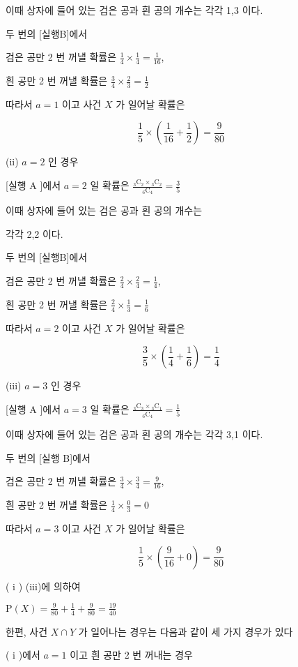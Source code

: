 \documentclass[10pt]{article}
\begin{document}
이때 상자에 들어 있는 검은 공과 흰 공의 개수는 각각 1,3 이다.

두 번의 [실행B]에서

검은 공만 2 번 꺼낼 확률은 \(\frac{1}{4} \times \frac{1}{4}=\frac{1}{16}\),

흰 공만 2 번 꺼낼 확률은 \(\frac{3}{4} \times \frac{2}{3}=\frac{1}{2}\)

따라서 \(a=1\) 이고 사건 \(X\) 가 일어날 확률은

\[
\frac{1}{5} \times\left(\frac{1}{16}+\frac{1}{2}\right)=\frac{9}{80}
\]

(ii) \(a=2\) 인 경우

[실행 A ]에서 \(a=2\) 일 확률은 \(\frac{{ }_{3} \mathrm{C}_{2} \times{ }_{3} \mathrm{C}_{2}}{{ }_{6} \mathrm{C}_{4}}=\frac{3}{5}\)

이때 상자에 들어 있는 검은 공과 흰 공의 개수는

각각 2,2 이다.

두 번의 [실행B]에서

검은 공만 2 번 꺼낼 확률은 \(\frac{2}{4} \times \frac{2}{4}=\frac{1}{4}\),

흰 공만 2 번 꺼낼 확률은 \(\frac{2}{4} \times \frac{1}{3}=\frac{1}{6}\)

따라서 \(a=2\) 이고 사건 \(X\) 가 일어날 확률은

\[
\frac{3}{5} \times\left(\frac{1}{4}+\frac{1}{6}\right)=\frac{1}{4}
\]

(iii) \(a=3\) 인 경우

[실행 A ]에서 \(a=3\) 일 확률은 \(\frac{{ }_{3} \mathrm{C}_{3} \times{ }_{3} \mathrm{C}_{1}}{{ }_{6} \mathrm{C}_{4}}=\frac{1}{5}\)

이때 상자에 들어 있는 검은 공과 흰 공의 개수는 각각 3,1 이다.

두 번의 [실행 B]에서

검은 공만 2 번 꺼낼 확률은 \(\frac{3}{4} \times \frac{3}{4}=\frac{9}{16}\),

흰 공만 2 번 꺼낼 확률은 \(\frac{1}{4} \times \frac{0}{3}=0\)

따라서 \(a=3\) 이고 사건 \(X\) 가 일어날 확률은

\[
\frac{1}{5} \times\left(\frac{9}{16}+0\right)=\frac{9}{80}
\]

( i ) (iii)에 의하여

\(\mathrm{P}(X)=\frac{9}{80}+\frac{1}{4}+\frac{9}{80}=\frac{19}{40}\)

한편, 사건 \(X \cap Y\) 가 일어나는 경우는 다음과 같이 세 가지 경우가 있다

( i )에서 \(a=1\) 이고 흰 공만 2 번 꺼내는 경우
\end{document}

